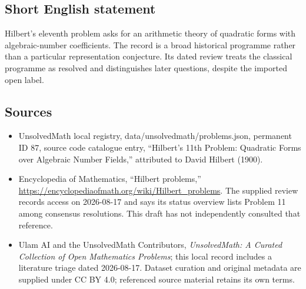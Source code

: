 \documentclass[11pt]{article}
\begin{document}
\subsection{Short English statement}
Hilbert's eleventh problem asks for an arithmetic theory of quadratic forms with algebraic-number coefficients. The record is a broad historical programme rather than a particular representation conjecture. Its dated review treats the classical programme as resolved and distinguishes later questions, despite the imported open label.
\subsection{Sources}
\begin{itemize}
\item UnsolvedMath local registry, data/unsolvedmath/problems.json, permanent ID 87, source code catalogue entry, ``Hilbert's 11th Problem: Quadratic Forms over Algebraic Number Fields,'' attributed to David Hilbert (1900).
\item Encyclopedia of Mathematics, ``Hilbert problems,'' \url{https://encyclopediaofmath.org/wiki/Hilbert_problems}. The supplied review records access on 2026-08-17 and says its status overview lists Problem 11 among consensus resolutions. This draft has not independently consulted that reference.
\item Ulam AI and the UnsolvedMath Contributors, \emph{UnsolvedMath: A Curated Collection of Open Mathematics Problems}; this local record includes a literature triage dated 2026-08-17. Dataset curation and original metadata are supplied under CC BY 4.0; referenced source material retains its own terms.
\end{itemize}
\end{document}

